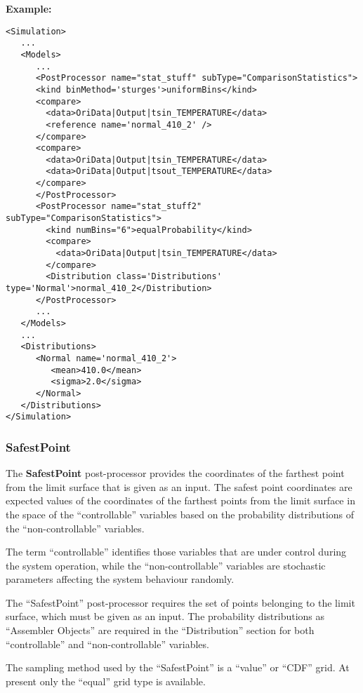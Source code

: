 \textbf{Example:}
\begin{lstlisting}[style=XML]
<Simulation>
   ...
   <Models>
      ...
      <PostProcessor name="stat_stuff" subType="ComparisonStatistics">
      <kind binMethod='sturges'>uniformBins</kind>
      <compare>
        <data>OriData|Output|tsin_TEMPERATURE</data>
        <reference name='normal_410_2' />
      </compare>
      <compare>
        <data>OriData|Output|tsin_TEMPERATURE</data>
        <data>OriData|Output|tsout_TEMPERATURE</data>
      </compare>
      </PostProcessor>
      <PostProcessor name="stat_stuff2" subType="ComparisonStatistics">
        <kind numBins="6">equalProbability</kind>
        <compare>
          <data>OriData|Output|tsin_TEMPERATURE</data>
        </compare>
        <Distribution class='Distributions' type='Normal'>normal_410_2</Distribution>
      </PostProcessor>
      ...
   </Models>
   ...
   <Distributions>
      <Normal name='normal_410_2'>
         <mean>410.0</mean>
         <sigma>2.0</sigma>
      </Normal>
   </Distributions>
</Simulation>
\end{lstlisting}

\subsubsection{SafestPoint}
\label{SafestPoint}
The \textbf{SafestPoint} post-processor provides the coordinates of the farthest
point from the limit surface that is given as an input.
%
The safest point coordinates are expected values of the coordinates of the
farthest points from the limit surface in the space of the ``controllable''
variables based on the probability distributions of the ``non-controllable''
variables.

The term ``controllable'' identifies those variables that are under control
during the system operation, while the ``non-controllable'' variables are
stochastic parameters affecting the system behaviour randomly.

The ``SafestPoint'' post-processor requires the set of points belonging to the
limit surface, which must be given as an input.
%
The probability distributions as ``Assembler Objects'' are required in the
``Distribution'' section for both ``controllable'' and ``non-controllable''
variables.

The sampling method used by the ``SafestPoint'' is a ``value'' or ``CDF'' grid.
%
At present only the ``equal'' grid type is available.


